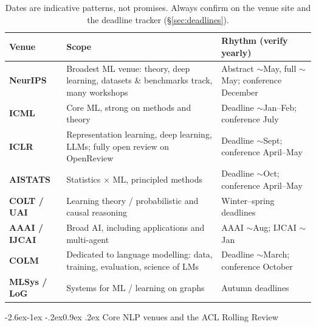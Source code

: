 \documentclass[11pt,a4paper]{article}
\makeatletter
\renewcommand\subsection{\@startsection{subsection}{2}{\z@}%
  {-2.6ex\@plus -1ex \@minus -.2ex}{0.9ex \@plus .2ex}%
  {\normalfont\large\bfseries\color{brandlight}}}
\newcommand{\thead}[1]{\textbf{\color{brand}#1}}
\makeatother
\begin{document}
\begin{table}[h]
\centering
\small
\begin{tabularx}{\textwidth}{L{2.4cm} X L{3.5cm}}
\toprule
\thead{Venue} & \thead{Scope} & \thead{Rhythm (verify yearly)} \\
\midrule
{}
\textbf{NeurIPS} & Broadest ML venue: theory, deep learning, datasets \&
benchmarks track, many workshops & Abstract $\sim$May, full $\sim$May;
conference December \\
\textbf{ICML} & Core ML, strong on methods and theory &
Deadline $\sim$Jan--Feb; conference July \\
\textbf{ICLR} & Representation learning, deep learning, LLMs; fully open
review on OpenReview & Deadline $\sim$Sept; conference April--May \\
\textbf{AISTATS} & Statistics $\times$ ML, principled methods &
Deadline $\sim$Oct; conference April--May \\
\textbf{COLT / UAI} & Learning theory / probabilistic and causal reasoning &
Winter--spring deadlines \\
\textbf{AAAI / IJCAI} & Broad AI, including applications and multi-agent &
AAAI $\sim$Aug; IJCAI $\sim$Jan \\
\textbf{COLM} & Dedicated to language modelling: data, training, evaluation,
science of LMs & Deadline $\sim$March; conference October \\
\textbf{MLSys / LoG} & Systems for ML / learning on graphs &
Autumn deadlines \\
\bottomrule
\end{tabularx}
\caption*{\small\color{mutegray} Dates are indicative patterns, not promises.
Always confirm on the venue site and the deadline tracker (\S\ref{sec:deadlines}).}
\end{table}

\subsection{Core NLP venues and the ACL Rolling Review}
\end{document}
